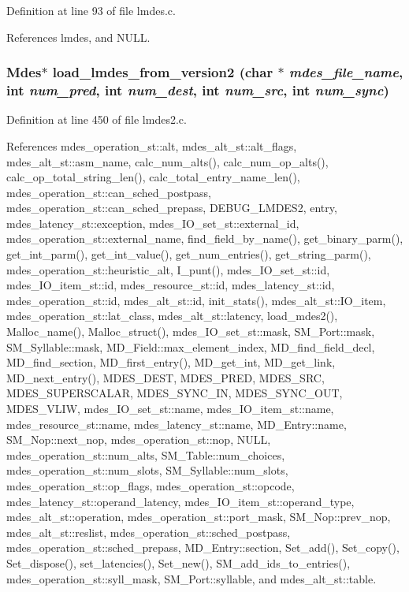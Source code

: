 Definition at line 93 of file lmdes.c.

References lmdes, and NULL.
\subsubsection{\setlength{\rightskip}{0pt plus 5cm}\bf{Mdes}$\ast$ load\_\-lmdes\_\-from\_\-version2 (char $\ast$ {\em mdes\_\-file\_\-name}, int {\em num\_\-pred}, int {\em num\_\-dest}, int {\em num\_\-src}, int {\em num\_\-sync})}\label{lmdes_8h_e2378554663e4703270b58eafd85f52f}




Definition at line 450 of file lmdes2.c.

References mdes\_\-operation\_\-st::alt, mdes\_\-alt\_\-st::alt\_\-flags, mdes\_\-alt\_\-st::asm\_\-name, calc\_\-num\_\-alts(), calc\_\-num\_\-op\_\-alts(), calc\_\-op\_\-total\_\-string\_\-len(), calc\_\-total\_\-entry\_\-name\_\-len(), mdes\_\-operation\_\-st::can\_\-sched\_\-postpass, mdes\_\-operation\_\-st::can\_\-sched\_\-prepass, DEBUG\_\-LMDES2, entry, mdes\_\-latency\_\-st::exception, mdes\_\-IO\_\-set\_\-st::external\_\-id, mdes\_\-operation\_\-st::external\_\-name, find\_\-field\_\-by\_\-name(), get\_\-binary\_\-parm(), get\_\-int\_\-parm(), get\_\-int\_\-value(), get\_\-num\_\-entries(), get\_\-string\_\-parm(), mdes\_\-operation\_\-st::heuristic\_\-alt, I\_\-punt(), mdes\_\-IO\_\-set\_\-st::id, mdes\_\-IO\_\-item\_\-st::id, mdes\_\-resource\_\-st::id, mdes\_\-latency\_\-st::id, mdes\_\-operation\_\-st::id, mdes\_\-alt\_\-st::id, init\_\-stats(), mdes\_\-alt\_\-st::IO\_\-item, mdes\_\-operation\_\-st::lat\_\-class, mdes\_\-alt\_\-st::latency, load\_\-mdes2(), Malloc\_\-name(), Malloc\_\-struct(), mdes\_\-IO\_\-set\_\-st::mask, SM\_\-Port::mask, SM\_\-Syllable::mask, MD\_\-Field::max\_\-element\_\-index, MD\_\-find\_\-field\_\-decl, MD\_\-find\_\-section, MD\_\-first\_\-entry(), MD\_\-get\_\-int, MD\_\-get\_\-link, MD\_\-next\_\-entry(), MDES\_\-DEST, MDES\_\-PRED, MDES\_\-SRC, MDES\_\-SUPERSCALAR, MDES\_\-SYNC\_\-IN, MDES\_\-SYNC\_\-OUT, MDES\_\-VLIW, mdes\_\-IO\_\-set\_\-st::name, mdes\_\-IO\_\-item\_\-st::name, mdes\_\-resource\_\-st::name, mdes\_\-latency\_\-st::name, MD\_\-Entry::name, SM\_\-Nop::next\_\-nop, mdes\_\-operation\_\-st::nop, NULL, mdes\_\-operation\_\-st::num\_\-alts, SM\_\-Table::num\_\-choices, mdes\_\-operation\_\-st::num\_\-slots, SM\_\-Syllable::num\_\-slots, mdes\_\-operation\_\-st::op\_\-flags, mdes\_\-operation\_\-st::opcode, mdes\_\-latency\_\-st::operand\_\-latency, mdes\_\-IO\_\-item\_\-st::operand\_\-type, mdes\_\-alt\_\-st::operation, mdes\_\-operation\_\-st::port\_\-mask, SM\_\-Nop::prev\_\-nop, mdes\_\-alt\_\-st::reslist, mdes\_\-operation\_\-st::sched\_\-postpass, mdes\_\-operation\_\-st::sched\_\-prepass, MD\_\-Entry::section, Set\_\-add(), Set\_\-copy(), Set\_\-dispose(), set\_\-latencies(), Set\_\-new(), SM\_\-add\_\-ids\_\-to\_\-entries(), mdes\_\-operation\_\-st::syll\_\-mask, SM\_\-Port::syllable, and mdes\_\-alt\_\-st::table.

